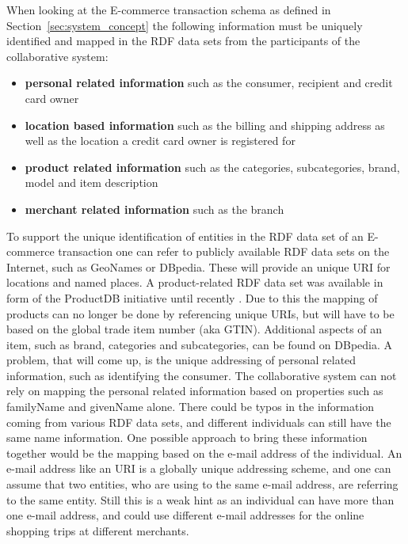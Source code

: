 

When looking at the \gls{E-commerce} transaction schema as defined in Section~\ref{sec:system_concept} the following information must be uniquely identified and mapped in the \gls{RDF} data sets from the participants of the collaborative system: \@

\begin{itemize}
	\item \textbf{personal related information} such as the consumer, recipient and credit card owner
	\item \textbf{location based information} such as the billing and shipping address as well as the location a credit card owner is registered for
	\item \textbf{product related information} such as the categories, subcategories, brand, model and item description
	\item \textbf{merchant related information} such as the branch
\end{itemize}

To support the unique identification of entities in the \gls{RDF} data set of an \gls{E-commerce} transaction one can refer to publicly available \gls{RDF} data sets on the Internet, such as GeoNames or DBpedia. These will provide an unique \gls{URI} for locations and named places. A product-related \gls{RDF} data set was available in form of the ProductDB initiative until recently \citep{bouzidi2014product}. Due to this the mapping of products can no longer be done by referencing unique \gls{URI}s, but will have to be based on the global trade item number (aka \gls{GTIN}). Additional aspects of an item, such as brand, categories and subcategories, can be found on DBpedia. A problem, that will come up, is the unique addressing of personal related information, such as identifying the consumer. The collaborative system can not rely on mapping the personal related information based on properties such as familyName and givenName alone. There could be typos in the information coming from various \gls{RDF} data sets, and different individuals can still have the same name information. One possible approach to bring these information together would be the mapping based on the e-mail address of the individual. An e-mail address like an \gls{URI} is a globally unique addressing scheme, and one can assume that two entities, who are using to the same e-mail address, are referring to the same entity. Still this is a weak hint as an individual can have more than one e-mail address, and could use different e-mail addresses for the online shopping trips at different merchants.

